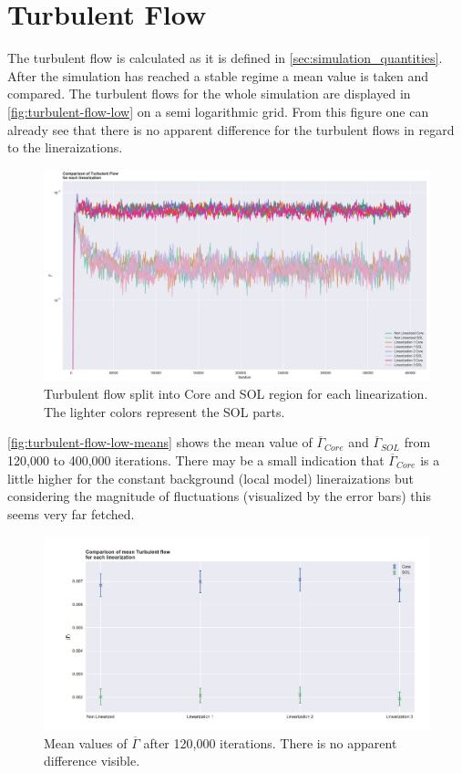\documentclass[master.tex]{subfiles}
\newcommand{\Tflow}[0]{\overline{\Gamma}}
\begin{document}
\section{Turbulent Flow}
The turbulent flow is calculated as it is defined in \autoref{sec:simulation_quantities}. After the simulation has reached a stable regime a mean value is taken and compared. The turbulent flows for the whole simulation are displayed in \autoref{fig:turbulent-flow-low} on a semi logarithmic grid. From this figure one can already see that there is no apparent difference for the turbulent flows in regard to the lineraizations.
\begin{figure}[!htbp]
    \includegraphics[width=\linewidth]{pdfs/turbulent-flow-low.pdf}
    \caption{Turbulent flow split into Core and \ac{SOL} region for each linearization. The lighter colors represent the \ac{SOL} parts.}
    \label{fig:turbulent-flow-low}
\end{figure}
\autoref{fig:turbulent-flow-low-means} shows the mean value of $\Tflow_{Core}$ and $\Tflow_{SOL}$ from 120,000 to 400,000 iterations. There may be a small indication that $\Tflow_{Core}$ is a little higher for the constant background (local model) lineraizations but considering the magnitude of fluctuations (visualized by the error bars) this seems very far fetched. 



\begin{figure}[!htbp]
    \includegraphics[width=\linewidth]{pdfs/turbulent-flow-low-means.pdf}
    \caption{Mean values of $\Tflow$ after 120,000 iterations. There is no apparent difference visible.}
    \label{fig:turbulent-flow-low-means}
\end{figure}
\end{document}
